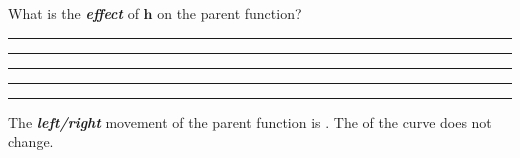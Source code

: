 What is the {\bfseries\itshape effect} of $\bm{h}$ on the parent function?

\rule{\textwidth}{0.15mm}

\rule{\textwidth}{0.15mm}

\rule{\textwidth}{0.15mm}

\rule{\textwidth}{0.15mm}

\rule{\textwidth}{0.15mm}

\vfill 

The {\bfseries\itshape left/right} movement of the parent function is 
 . 
The  of the curve does not change.